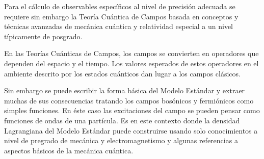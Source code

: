 Para el cálculo de observables específicos al nivel de precisión
adecuada se requiere sin embargo la Teoría Cuántica de Campos basada
en conceptos y técnicas avanzadas de mecánica cuántica y relatividad
especial a un nivel típicamente de posgrado.

En las Teorías Cuánticas de Campos, los campos se
convierten en operadores que dependen del espacio y el tiempo. Los
valores esperados de estos operadores en el ambiente descrito por los
estados cuánticos dan lugar a los campos clásicos. 

Sin embargo se puede escribir la forma básica del Modelo Estándar y
extraer muchas de sus consecuencias tratando los campos bosónicos y
fermiónicos como simples funciones. En éste caso las excitaciones del
campo se pueden pensar como funciones de ondas de una partícula. Es en
este contexto donde la densidad Lagrangiana del Modelo Estándar puede
construirse usando solo conocimientos a nivel de pregrado de mecánica
y electromagnetismo y algunas referencias a aspectos básicos de la
mecánica cuántica.




